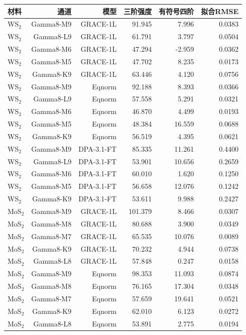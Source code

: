 \begin{tabular}{lrrrrr}
\toprule
材料 & 通道 & 模型 & 三阶强度 & 有符号四阶 & 拟合RMSE \\
\midrule
WS$_2$ & Gamma8-M9 & GRACE-1L & 91.945 & 7.996 & 0.0383 \\
WS$_2$ & Gamma8-L9 & GRACE-1L & 61.791 & 3.797 & 0.0504 \\
WS$_2$ & Gamma8-M6 & GRACE-1L & 47.294 & -2.959 & 0.0362 \\
WS$_2$ & Gamma8-M5 & GRACE-1L & 47.702 & 8.235 & 0.0173 \\
WS$_2$ & Gamma8-K9 & GRACE-1L & 63.446 & 4.120 & 0.0756 \\
WS$_2$ & Gamma8-M9 & Eqnorm & 92.188 & 8.393 & 0.0366 \\
WS$_2$ & Gamma8-L9 & Eqnorm & 57.558 & 5.291 & 0.0321 \\
WS$_2$ & Gamma8-M6 & Eqnorm & 46.870 & 4.499 & 0.0193 \\
WS$_2$ & Gamma8-M5 & Eqnorm & 48.384 & 16.559 & 0.0688 \\
WS$_2$ & Gamma8-K9 & Eqnorm & 56.519 & 4.395 & 0.0621 \\
WS$_2$ & Gamma8-M9 & DPA-3.1-FT & 85.335 & 11.261 & 0.4400 \\
WS$_2$ & Gamma8-L9 & DPA-3.1-FT & 53.901 & 10.656 & 0.2659 \\
WS$_2$ & Gamma8-M6 & DPA-3.1-FT & 60.010 & 1.620 & 0.1250 \\
WS$_2$ & Gamma8-M5 & DPA-3.1-FT & 56.658 & 12.076 & 0.1242 \\
WS$_2$ & Gamma8-K9 & DPA-3.1-FT & 53.611 & 9.988 & 0.2427 \\
MoS$_2$ & Gamma8-M9 & GRACE-1L & 101.379 & 8.466 & 0.0307 \\
MoS$_2$ & Gamma8-M8 & GRACE-1L & 80.688 & 3.900 & 0.0349 \\
MoS$_2$ & Gamma8-M7 & GRACE-1L & 65.535 & 10.076 & 0.0089 \\
MoS$_2$ & Gamma8-K9 & GRACE-1L & 70.232 & 4.944 & 0.0738 \\
MoS$_2$ & Gamma8-L8 & GRACE-1L & 57.848 & 0.247 & 0.0158 \\
MoS$_2$ & Gamma8-M9 & Eqnorm & 98.353 & 11.093 & 0.0874 \\
MoS$_2$ & Gamma8-M8 & Eqnorm & 76.165 & 17.304 & 0.0348 \\
MoS$_2$ & Gamma8-M7 & Eqnorm & 57.659 & 19.641 & 0.0521 \\
MoS$_2$ & Gamma8-K9 & Eqnorm & 62.010 & 6.123 & 0.0272 \\
MoS$_2$ & Gamma8-L8 & Eqnorm & 53.891 & 2.775 & 0.0194 \\

\end{tabular}
